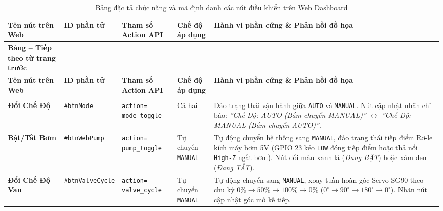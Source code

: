 \begingroup
\setlength{\tabcolsep}{3.5pt}
\small
\renewcommand{\arraystretch}{1.25}
\begin{longtable}{|>{\raggedright\arraybackslash}p{2.2cm}|>{\raggedright\arraybackslash}p{2.85cm}|>{\raggedright\arraybackslash}p{2.5cm}|>{\centering\arraybackslash}p{1.8cm}|>{\raggedright\arraybackslash}p{5.15cm}|}
\caption{Bảng đặc tả chức năng và mã định danh các nút điều khiển trên Web Dashboard} \label{tab:web_buttons_spec} \\
\hline
\textbf{Tên nút trên Web} & \textbf{ID phần tử} & \textbf{Tham số Action API} & \textbf{Chế độ áp dụng} & \textbf{Hành vi phần cứng \& Phản hồi đồ họa} \\ \hline
\endfirsthead

\multicolumn{5}{c}%
{{\bfseries Bảng \thetable{} -- Tiếp theo từ trang trước}} \\
\hline
\textbf{Tên nút trên Web} & \textbf{ID phần tử} & \textbf{Tham số Action API} & \textbf{Chế độ áp dụng} & \textbf{Hành vi phần cứng \& Phản hồi đồ họa} \\ \hline
\endhead

\hline \multicolumn{5}{|r|}{{\footnotesize\textit{(Còn tiếp ở trang sau)}}} \\ \hline
\endfoot

\hline
\endlastfoot

\textbf{Đổi Chế Độ} & \texttt{\#btnMode} & \texttt{action=} \newline \texttt{mode\_toggle} & Cả hai & Đảo trạng thái vận hành giữa \texttt{AUTO} và \texttt{MANUAL}. Nút cập nhật nhãn chỉ báo: \textit{''Chế Độ: AUTO (Bấm chuyển MANUAL)''} $\leftrightarrow$ \textit{''Chế Độ: MANUAL (Bấm chuyển AUTO)''}. \\ \hline

\textbf{Bật/Tắt Bơm} & \texttt{\#btnWebPump} & \texttt{action=} \newline \texttt{pump\_toggle} & Tự chuyển \texttt{MANUAL} & Tự động chuyển hệ thống sang \texttt{MANUAL}, đảo trạng thái tiếp điểm Rơ-le kích máy bơm 5V (GPIO 23 kéo \texttt{LOW} đóng tiếp điểm hoặc thả nổi \texttt{High-Z} ngắt bơm). Nút đổi màu xanh lá (\textit{Đang BẬT}) hoặc xám đen (\textit{Đang TẮT}). \\ \hline

\textbf{Đổi Chế Độ Van} & \texttt{\#btnValveCycle} & \texttt{action=} \newline \texttt{valve\_cycle} & Tự chuyển \texttt{MANUAL} & Tự động chuyển sang \texttt{MANUAL}, xoay tuần hoàn góc Servo SG90 theo chu kỳ $0\% \to 50\% \to 100\% \to 0\%$ ($0^\circ \to 90^\circ \to 180^\circ \to 0^\circ$). Nhãn nút cập nhật góc mở kế tiếp. \\ \hline


\end{longtable}
